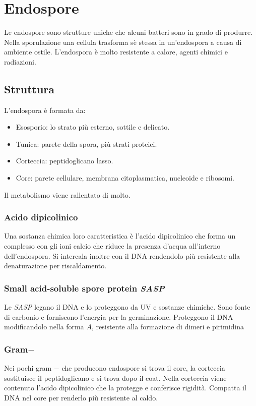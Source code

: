 \section{Endospore}
Le endospore sono strutture uniche che alcuni batteri sono in grado di produrre.
Nella sporulazione una cellula trasforma s\`e stessa in un'endospora a causa di ambiente ostile.
L'endospora \`e molto resistente a calore, agenti chimici e radiazioni.

	\subsection{Struttura}
	L'endospora \`e formata da:
	\begin{multicols}{2}
		\begin{itemize}
			\item Esosporio: lo strato pi\`u esterno, sottile e delicato.
			\item Tunica: parete della spora, pi\`u strati proteici.
			\item Corteccia: peptidoglicano lasso.
			\item Core: parete cellulare, membrana citoplasmatica, nucleoide e ribosomi.
		\end{itemize}
	\end{multicols}
	Il metabolismo viene rallentato di molto.

		\subsubsection{Acido dipicolinico}
		Una sostanza chimica loro caratteristica \`e l'acido dipicolinico che forma un complesso con gli ioni calcio  che riduce la presenza d'acqua all'interno dell'endospora.
		Si intercala inoltre con il DNA rendendolo pi\`u resistente alla denaturazione per riscaldamento.

		\subsubsection{Small acid-soluble spore protein \emph{SASP}}
		Le \emph{SASP} legano il DNA e lo proteggono da UV e sostanze chimiche.
		Sono fonte di carbonio e forniscono l'energia per la germinazione.
		Proteggono il DNA modificandolo nella forma $A$, resistente alla formazione di dimeri e pirimidina

		\subsubsection{Gram$\mathbf{-}$}
		Nei pochi gram $-$ che producono endospore si trova il core, la corteccia sostituisce il peptidoglicano e si trova dopo il coat.
		Nella corteccia viene contenuto l'acido dipicolinico che la protegge e conferisce rigidit\`a.
		Compatta il DNA nel core per renderlo pi\`u resistente al caldo.

